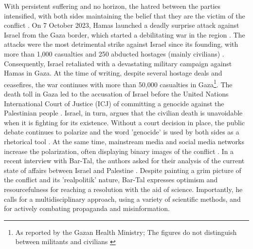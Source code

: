 \documentclass[dissertation,math,vertlayout,pdfa,colorlinks,nologo]{aaltoseries}
\begin{document}
With persistent suffering and no horizon, the hatred between the parties intensified, with both sides maintaining the belief that they are the victim of the conflict \cite{leshemSocietalBeliefsCollective2022}. On 7 October 2023, Hamas launched a deadly surprise attack against Israel from the Gaza border, which started a debilitating war in the region \cite{bymanWarTheyBoth2024}. The attacks were the most detrimental strike against Israel since its founding, with more than 1,000 casualties and 250 abducted hostages (mainly civilians) \cite{flamerAsymmetricBattleWits2025}. Consequently, Israel retaliated with a devastating military campaign against Hamas in Gaza. At the time of writing, despite several hostage deals and ceasefires, the war continues with more than 50,000 casualties in Gaza\footnote{As reported by the Gazan Health Ministry; The figures do not distinguish between militants and civilians  \cite{kershnerIsraelExpandsGaza2025}}. The death toll in Gaza led to the accusation of Israel before the United Nations International Court of Justice (ICJ) of committing a genocide against the Palestinian people \cite{atadjanovGenocideCaseIsrael2024}. Israel, in turn, argues that the civilian death is unavoidable when it is fighting for its existence. Without a court decision in place, the public debate continues to polarize and the word 'genocide' is used by both sides as a rhetorical tool \cite{jamesItGenocideGaza2025}. At the same time, mainstream media and social media networks increase the polarization, often displaying binary images of the conflict \cite{osimenMisconstructionEnemyImages2023}. In a recent interview with Bar-Tal, the authors asked for their analysis of the current state of affairs between Israel and Palestine \cite{bar-talDanielBartalIsraelipalestinian2024}. Despite painting a grim picture of the conflict and its 'realpolitik' nature, Bar-Tal expresses optimism and resourcefulness for reaching a resolution with the aid of science. Importantly, he calls for a multidisciplinary approach, using a variety of scientific methods, and for actively combating propaganda and misinformation.
\end{document}
